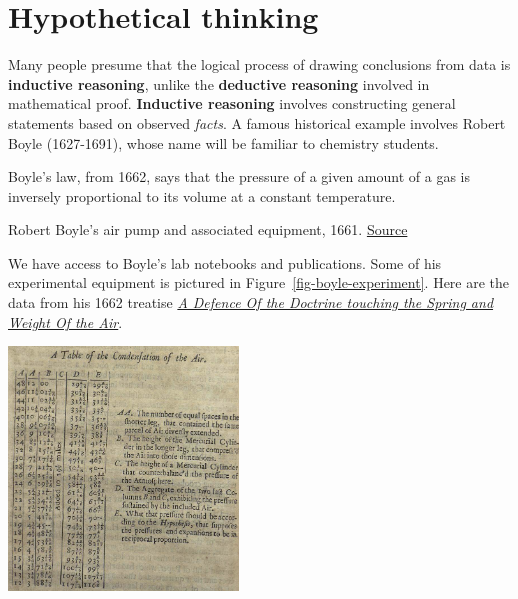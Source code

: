 \documentclass[
  letterpaper,
  DIV=11,
  numbers=noendperiod,
  oneside]{scrartcl}
\begin{document}
\newpage

\section{Hypothetical thinking}\label{hypothetical-thinking}

Many people presume that the logical process of drawing conclusions from
data is \textbf{inductive reasoning}, unlike the \textbf{deductive
reasoning} involved in mathematical proof. \textbf{Inductive reasoning}
involves constructing general statements based on observed \emph{facts}.
A famous historical example involves Robert Boyle (1627-1691), whose
name will be familiar to chemistry students.

Boyle's law, from 1662, says that the pressure of a given amount of a
gas is inversely proportional to its volume at a constant temperature.

\begin{marginfigure}


\caption{\label{fig-boyle-experiment}Robert Boyle's air pump and
associated equipment, 1661.
\href{https://www.college.columbia.edu/core/content/drawing-robert-boyle\%E2\%80\%99s-air-pump-1661}{Source}}

\end{marginfigure}%

We have access to Boyle's lab notebooks and publications. Some of his
experimental equipment is pictured in Figure~\ref{fig-boyle-experiment}.
Here are the data from his 1662 treatise
\href{https://bvpb.mcu.es/en/catalogo_imagenes/grupo.do?path=11143411}{\emph{A
Defence Of the Doctrine touching the Spring and Weight Of the Air}}.

\includegraphics[width=2.41in,height=\textheight]{www/Boyle-data.png}
\end{document}
